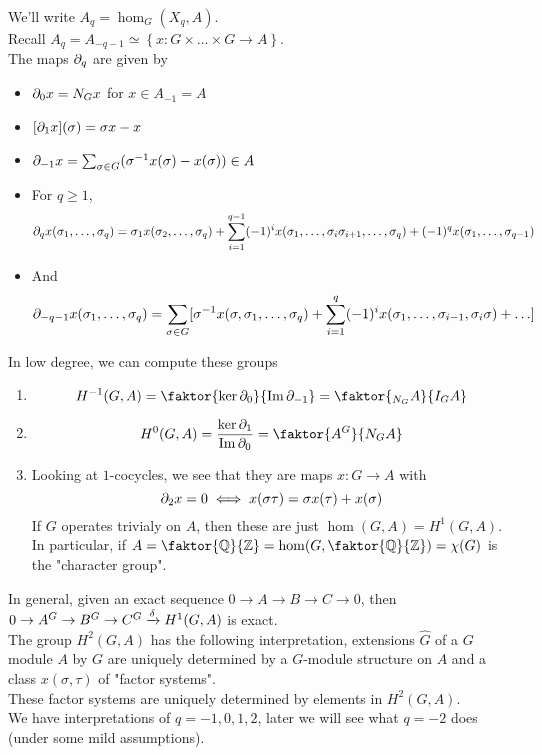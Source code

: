 \documentclass[../main.tex]{subfiles}
\begin{document}
We'll write $A_q= \hom_G( X_q, A) $.\\
Recall $A_q = A_{-q-1} \simeq \left\{ x: G\times \ldots \times G\to A \right\} $.\\
The maps $\partial_q$ are given by
\begin{itemize}
\item $\partial_0x = N_Gx$ for $x\in A_{-1} = A$ 
\item $ [ \partial_1 x] ( \sigma) = \sigma x -x$ 
\item $\partial_{-1} x = \sum_{\sigma \in G} ( \sigma^{-1}x( \sigma) - x( \sigma) ) \in A$ 
\item For $q \geq 1$,
	\[ 
	\partial_q x ( \sigma_1,\ldots,\sigma_q) = \sigma_1 x( \sigma_2,\ldots,\sigma_q) + \sum_{i=1}^{ q-1}( -1)^{i} x( \sigma_1,\ldots,\sigma_i\sigma_{i+1} ,\ldots,\sigma_q) + ( -1)^{q}x( \sigma_1,\ldots,\sigma_{q-1} ) 
	\]

\item And
	\[ 
	\partial_{-q-1} x ( \sigma_1,\ldots,\sigma_q) = \sum_{\sigma \in G} [ \sigma^{-1}x( \sigma, \sigma_1,\ldots, \sigma_q) + \sum_{i=1}^{ q}( -1)^{i}x( \sigma_1,\ldots,\sigma_{i-1} ,\sigma_i\sigma) + \ldots] 
	\]
					
\end{itemize}
In low degree, we can compute these groups
\begin{enumerate}
\item 
	\[ 
		H^{-1}( G,A) = \faktor{\ker \del_0}{\im \del_{-1} }= \faktor{{}_{N_G} A}{I_G A}
	\]

\item 
	\[ 
	H^{0}( G,A) = \frac{\ker \del_1}{\im \del_0}= \faktor{ A^{G}}{N_G A}
	\]
	

\item Looking at $1$-cocycles, we see that they are maps $x:G\to A$ with 
	\[ 
	\partial_2 x =0 \iff x( \sigma\tau) = \sigma x( \tau) + x( \sigma) 
	\]
If $G$ operates trivialy on $A$, then these are just $\hom( G,A) = H^{1}( G,A) $.\\
In particular, if $A= \faktor{\mathbb{Q}}{\mathbb{Z}}= \hom( G, \faktor{\mathbb{Q}}{\mathbb{Z}})=\chi( G)  $ is the "character group".
\end{enumerate}
In general, given an exact sequence $0\to A\to B \to C \to 0$, then $0 \to A^{G}\to B^{G}\to C^{G}\xrightarrow{\delta} H^{1}( G,A) $ is exact.\\
The group $H^{2}( G,A) $ has the following interpretation, extensions $\hat{G}$  of a $G$ module $A$ by $G$ are uniquely determined by a $G$-module structure on $A$ and a class $x( \sigma,\tau)$ of "factor systems".\\
These factor systems are uniquely determined by elements in $H^{2}( G,A) $.\\
We have interpretations of $q=-1,0,1,2$, later we will see what $q=-2$ does (under some mild assumptions).
\end{document}
